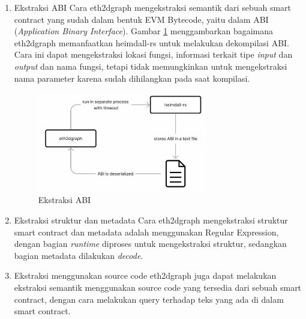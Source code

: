 \begin{enumerate}
  \item Ekstraksi ABI \newline Cara eth2dgraph mengekstraksi semantik dari sebuah smart contract yang sudah dalam bentuk EVM Bytecode, yaitu dalam ABI (\textit{Application Binary Interface}). Gambar \ref{image:abi-extraction} menggambarkan bagaimana eth2dgraph memanfaatkan heimdall-rs untuk melakukan dekompilasi ABI. Cara ini dapat mengekstraksi lokasi fungsi, informasi terkait tipe \textit{input} dan \textit{output} dan nama fungsi, tetapi tidak memungkinkan untuk mengekstraksi nama parameter karena sudah dihilangkan pada saat kompilasi. 
  \begin{figure}
    \centering
    \includegraphics[width=0.7\textwidth]{resources/chapter-2/eth2dgraph-heimdall.png}
    \caption{Ekstraksi ABI \parencite{aimar2023extraction}}
    \label{image:abi-extraction}
  \end{figure}  
  \item Ekstraksi struktur dan metadata \newline Cara eth2dgraph mengekstraksi struktur smart contract dan metadata adalah menggunakan Regular Expression, dengan bagian \textit{runtime} diproses untuk mengekstraksi struktur, sedangkan bagian metadata dilakukan \textit{decode}.
  \item Ekstraksi menggunakan source code \newline eth2dgraph juga dapat melakukan ekstraksi semantik menggunakan source code yang tersedia dari sebuah smart contract, dengan cara melakukan query terhadap teks yang ada di dalam smart contract.
\end{enumerate}
